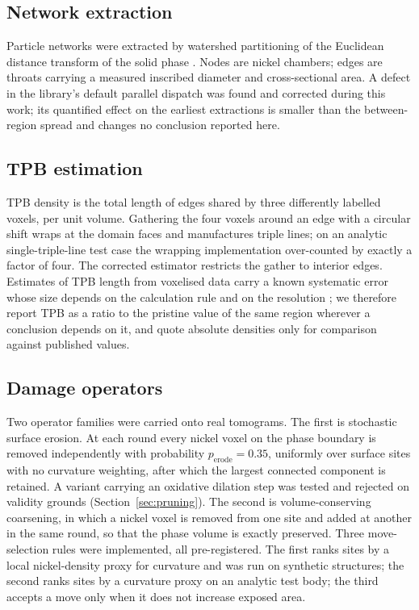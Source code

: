 \documentclass[5p,times,twocolumn]{elsarticle}
\begin{document}
\subsection{Network extraction}

Particle networks were extracted by watershed partitioning of the Euclidean
distance transform of the solid phase \cite{gostick2017}. Nodes are nickel
chambers; edges are throats carrying a measured inscribed diameter and
cross-sectional area. A defect in the library's default parallel dispatch was
found and corrected during this work; its quantified effect on the earliest
extractions is smaller than the between-region spread and changes no
conclusion reported here.

\subsection{TPB estimation}

TPB density is the total length of edges shared by three differently labelled
voxels, per unit volume. Gathering the four voxels around an edge with a
circular shift wraps at the domain faces and manufactures triple lines; on an
analytic single-triple-line test case the wrapping implementation over-counted
by exactly a factor of four. The corrected estimator restricts the gather to
interior edges. Estimates of TPB length from voxelised data carry a known
systematic error whose size depends on the calculation rule and on the
resolution \cite{jorgensen2014,shimura2016}; we therefore report TPB as a
ratio to the pristine value of the same region wherever a conclusion depends
on it, and quote absolute densities only for comparison against published
values.

\subsection{Damage operators}

Two operator families were carried onto real tomograms. The first is
stochastic surface erosion. At each round every nickel voxel on the phase
boundary is
removed independently with probability $p_{\mathrm{erode}}=0.35$, uniformly
over surface sites with no curvature weighting, after which the largest
connected component is retained. A variant carrying an oxidative dilation step
was tested and rejected on validity grounds (Section~\ref{sec:pruning}). The
second is volume-conserving coarsening, in which a nickel voxel is removed
from one site and added at another in the same round, so that the phase volume
is exactly preserved. Three move-selection rules were implemented, all
pre-registered. The first ranks sites by a local nickel-density proxy for
curvature and was run on synthetic structures; the second ranks sites by a
curvature proxy on an analytic test body; the third accepts a move only when
it does not increase exposed area.
\end{document}
